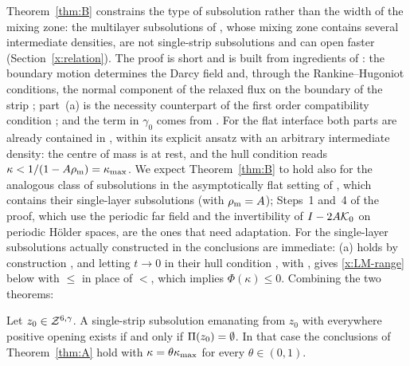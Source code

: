Theorem~\ref{thm:B} constrains the type of subsolution rather than the width of the mixing zone: the multilayer subsolutions of \cite[Sec.~7.5]{LM26}, whose mixing zone contains several
intermediate densities, are not single-strip subsolutions and can open faster (Section~\ref{x:relation}). The proof is short and is built from ingredients of \cite{LM26}: the boundary motion
determines the Darcy field and, through the Rankine--Hugoniot conditions, the normal component of the relaxed flux on the boundary of the strip \cite[Secs.~3.3.1--3.3.2 and (4.12)]{LM26};
part~(a) is the necessity counterpart of the first order compatibility condition \cite[Lemma~5.2]{LM26}; and the term in $\gamma_0$ comes from \cite[(3.7b)]{LM26}. For the flat interface both
parts are already contained in \cite[Sec.~3.2]{LM26}, within its explicit ansatz with an arbitrary intermediate density: the centre of mass is at rest, and the hull condition reads
$\kappa<1/(1-A\rho_{\mathrm m})=\kappa_{\max}$. We expect Theorem~\ref{thm:B} to hold also for the analogous class of subsolutions in the asymptotically flat setting of \cite{LM26}, which contains
their single-layer subsolutions (with $\rho_{\mathrm m}=A$); Steps~1 and~4 of the proof, which use the periodic far field and the invertibility of $I-2A\mathcal{K}_0$ on periodic H\"older spaces, are the ones that
need adaptation. For the single-layer subsolutions actually constructed in \cite{LM26} the conclusions are immediate: (a) holds by construction \cite[Lemma~5.2]{LM26}, and letting $t\to0$ in their
hull condition \cite[(4.14)]{LM26}, with \cite[(4.10), (7.9)--(7.11) and (3.7b)]{LM26}, gives \eqref{x:LM-range} below with $\le$ in place of $<$, which implies $\Phi(\kappa)\le0$.
Combining the two theorems:

\begin{corollary}\label{cor:pinch}
Let $z_0\in\mathcal{Z}^{6,\gamma}$. A single-strip subsolution emanating from $z_0$ with everywhere positive opening exists if and only if $\Pi(z_0)=\emptyset$. In that case the conclusions of Theorem~\ref{thm:A}
hold with $\kappa=\theta\kappa_{\max}$ for every $\theta\in(0,1)$.
\end{corollary}

